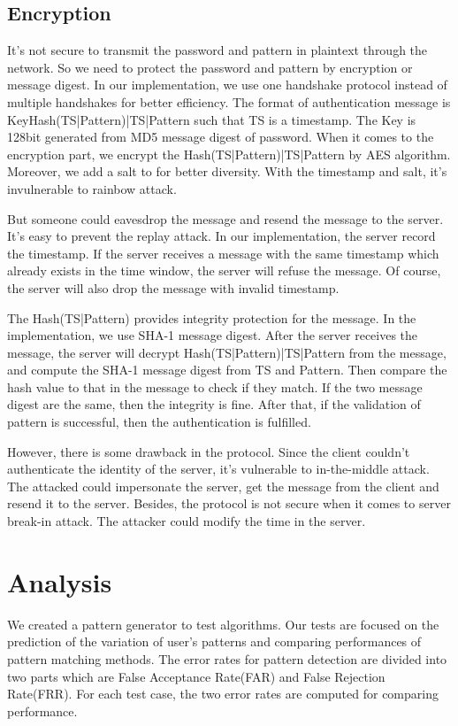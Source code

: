 \documentclass[twocolumn,showpacs,%
  nofootinbib,aps,%
  eqsecnum,prd,notitlepage,showkeys,10pt]{revtex4-1}
\begin{document}
\subsection{Encryption}
It's not secure to transmit the password and pattern in plaintext through the network. So we need to protect the password and pattern by encryption or message digest. In our implementation, we use one handshake protocol instead of multiple handshakes for better efficiency. The format of authentication message is Key{Hash(TS|Pattern)|TS|Pattern} such that TS is a timestamp. The Key is 128bit generated from MD5 message digest of password. When it comes to the encryption part, we encrypt the Hash(TS|Pattern)|TS|Pattern by AES algorithm. Moreover, we add a salt to for better diversity. With the timestamp and salt, it's invulnerable to rainbow attack.
\par
But someone could eavesdrop the message and resend the message to the server. It's easy to prevent the replay attack. In our implementation, the server record the timestamp. If the server receives a message with the same timestamp which already exists in the time window, the server will refuse the message. Of course, the server will also drop the message with invalid timestamp.
\par
The Hash(TS|Pattern) provides integrity protection for the message. In the implementation, we use SHA-1 message digest. After the server receives the message, the server will decrypt Hash(TS|Pattern)|TS|Pattern from the message, and compute the SHA-1 message digest from TS and Pattern. Then compare the hash value to that in the message to check if they match. If the two message digest are the same, then the integrity is fine. After that, if the validation of pattern is successful, then the authentication is fulfilled.
\par
However, there is some drawback in the protocol. Since the client couldn't authenticate the identity of the server, it's vulnerable to in-the-middle attack. The attacked could impersonate the server, get the message from the client and resend it to the server. Besides, the protocol is not secure when it comes to server break-in attack. The attacker could modify the time in the server.


\section{Analysis}
 We created a pattern generator to test algorithms. Our tests are focused on the prediction of the variation of user's patterns and comparing performances of pattern matching methods. The error rates for pattern detection are divided into two parts which are False Acceptance Rate(FAR) and False Rejection Rate(FRR)\cite{cho2000web}. For each test case, the two error rates are computed for comparing performance.
\end{document}
